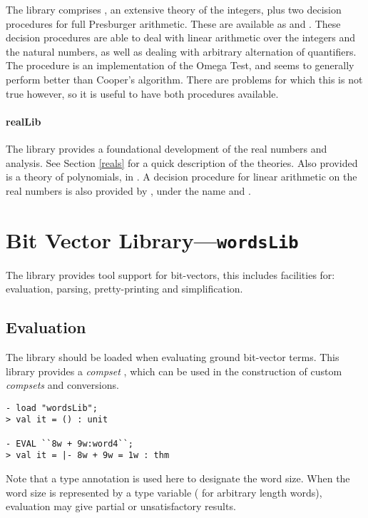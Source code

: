 The  library comprises , an extensive
theory of the integers, plus two decision procedures
for full Presburger arithmetic. These are available as
 and . These
decision procedures are able to deal with linear arithmetic
over the integers and the natural numbers, as well as dealing
with arbitrary alternation of quantifiers.  The 
procedure is an implementation of the Omega Test, and seems to
generally perform better than Cooper's algorithm.  There are problems
for which this is not true however, so it is useful to have both
procedures available.

\paragraph{realLib}

The  library provides a foundational development
of the real numbers and analysis. See Section \ref{reals}
for a quick description of the theories.
Also provided is a theory of polynomials, in .
A decision procedure for linear arithmetic on the real numbers
is also provided by , under the name 
and .

\section{Bit Vector Library---\texttt{wordsLib}}

The library  provides tool support for bit-vectors, this includes facilities for: evaluation, parsing, pretty-printing and simplification.

\subsection{Evaluation}

The library  should be loaded when evaluating ground bit-vector terms.  This library provides a \emph{compset} , which
can be used in the construction of custom \emph{compsets} and conversions.
\setcounter{sessioncount}{0}
\begin{session}
\begin{verbatim}
- load "wordsLib";
> val it = () : unit

- EVAL ``8w + 9w:word4``;
> val it = |- 8w + 9w = 1w : thm
\end{verbatim}
\end{session}
Note that a type annotation is used here to designate the word size.  When the word size is represented by a type variable (\ie{} for arbitrary length words), evaluation may give partial or unsatisfactory results.

